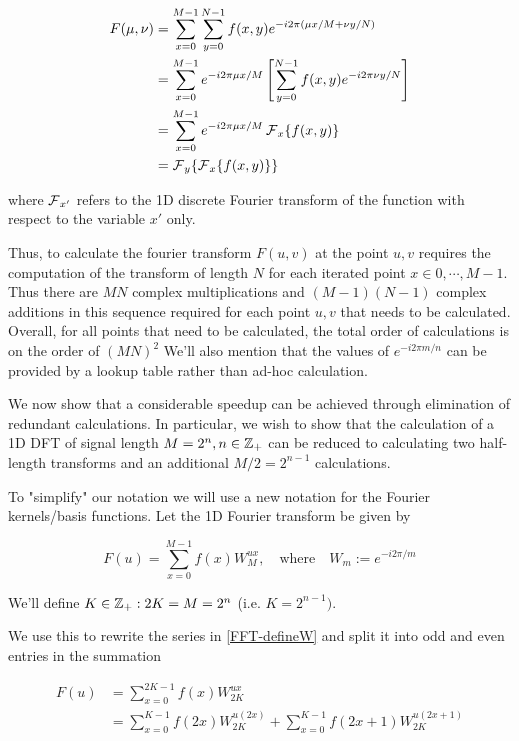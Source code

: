 \begin{align} \label{eq:2D-dft-rearrangement}
F(\mu,\nu) &= \sum_{x=0}^{M-1} \sum_{y=0}^{N-1} f(x,y) e^{-i2\pi \left(\mu x/M + \nu y/N\right)} \\
&= \sum_{x=0}^{M-1} e^{-i2\pi \mu x/M} \left[ \sum_{y=0}^{N-1} f(x,y)e^{-i2\pi \nu y/N} \right] \\
&= \sum_{x=0}^{M-1} e^{-i2\pi \mu x/M} \operatorname{\mathcal{F}}_x\{ f(x,y)\} \\
&= \operatorname{\mathcal{F}}_y\{\operatorname{\mathcal{F}}_x \{f(x,y)\} \}
\end{align}

where $\operatorname{\mathcal{F}}_{x'}$ refers to the 1D discrete Fourier transform of the function with respect to
the variable $x'$ only.

Thus, to calculate the fourier transform $F(u,v)$ at the point $u,v$
requires the computation of the transform of length $N$ for each iterated point $x \in 0,\cdots,M-1$. Thus there are $MN$ complex multiplications and $(M-1)(N-1)$ complex additions in this sequence required for each point $u,v$ that needs to be calculated. Overall, for all points that need to be calculated, the total order of calculations is on the order of $(MN)^2$ We'll also mention that the values of $e^{-i2\pi m/n}$ can be provided by a lookup table rather than ad-hoc calculation.

We now show that a considerable speedup can be achieved through elimination of redundant calculations. In particular, we wish to show that the calculation of a 1D DFT of signal length $M=2^n, n \in \mathbb{Z}_{+}$ can be reduced to calculating two half-length transforms and an additional $M/2 = 2^{n-1}$ calculations.


To "simplify" our notation we will use a new notation for the Fourier kernels/basis functions.
Let the 1D Fourier transform be given by

\begin{equation} \label{FFT-defineW}
F(u) = \sum_{x=0}^{M-1} f(x) W_M^{ux},\quad \textrm{where} \quad W_m := e^{-i2\pi/m}
\end{equation} 

We'll define $K \in \mathbb{Z}_{+} : 2K = M = 2^n$ (i.e. $K = 2^{n-1})$.

We use this to rewrite the series in \cref{FFT-defineW} and split it into odd and even entries in the summation

\begin{align}
F(u) &= \sum_{x=0}^{2K-1} f(x) W_{2K}^{ux} \\
&= \sum_{x=0}^{K-1} f(2x) W_{2K}^{u(2x)}
 + \sum_{x=0}^{K-1} f(2x+1) W_{2K}^{u(2x+1)} \label{FFT-oddevensplit}
\end{align}

